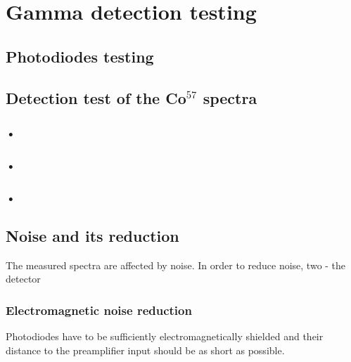 \chapter{Gamma detection testing}



\section{Photodiodes testing}

\section{Detection test of the Co$^{57}$ spectra}



\subsection*{•}

\subsection*{•}

\subsection*{•}


\section{Noise and its reduction}
The measured spectra are affected by noise. In order to reduce noise,  two - the detector  
\subsection{Electromagnetic noise reduction}
Photodiodes have to be sufficiently electromagnetically shielded and their distance to the preamplifier input should be as short as possible. 


